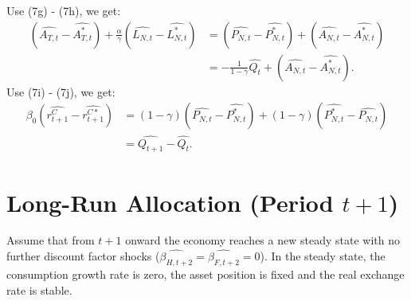 \documentclass[a4paper,12pt]{article} %
\theoremstyle{nonitalic}
\begin{document}
Use (7g) - (7h), we get:
\begin{align*}
    (\widehat{A_{T,t}} - \widehat{A_{T,t}^*}) + \frac{\alpha}{\gamma}(\widehat{L_{N,t}} - \widehat{L_{N,t}^*}) &= (\widehat{P_{N,t}} - \widehat{P_{N,t}^*}) + (\widehat{A_{N,t}} - \widehat{A_{N,t}^*}) \\
    &= - \frac{1}{1-\gamma} \widehat{Q_t} + (\widehat{A_{N,t}} - \widehat{A_{N,t}^*}) \tag{9d}.
\end{align*}
Use (7i) - (7j), we get:
\begin{align*}
    \beta_0(\widehat{r_{t+1}^C} - \widehat{r_{t+1}^{C*}}) &= (1-\gamma)(\widehat{P_{N,t}} - \widehat{P_{N,t}^*}) + (1-\gamma)(\widehat{P_{N,t}^*} - \widehat{P_{N,t}}) \\
    &= \widehat{Q_{t+1}} - \widehat{Q_t} \tag{9e}.
\end{align*}



\section{Long-Run Allocation (Period $t+1$)}

Assume that from $ t+1 $ onward the economy reaches a new steady state with no further discount factor shocks ($ \widehat{\beta_{H,t+2}} = \widehat{\beta_{F,t+2}} = 0 $).
In the steady state, the consumption growth rate is zero, the asset position is fixed and the real exchange rate is stable. 
\end{document}
